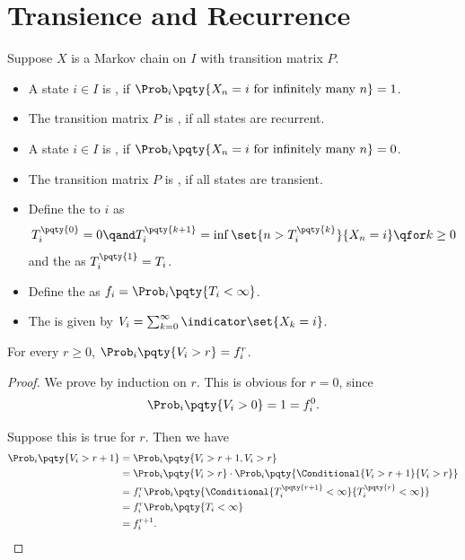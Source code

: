 \section{Transience and Recurrence}

\begin{definition}
    Suppose \(X\) is a Markov chain on \(I\) with transition matrix \(P\).
    \begin{itemize}
        \item A state \(i \in I\) is , if \(\Prob_i \pqty{X_n = i \text{ for infinitely many } n} = 1\).
        \item The transition matrix \(P\) is , if all states are recurrent.
        \item A state \(i \in I\) is , if \(\Prob_i \pqty{X_n = i \text{ for infinitely many } n} = 0\).
        \item The transition matrix \(P\) is , if all states are transient.
        \item Define the  to \(i\) as
        \[
            T_i^{\pqty{0}} = 0 \qand T_{i}^{\pqty{k + 1}} = \inf \set{n > T_i^{\pqty{k}}}{X_n = i} \qfor k \geq 0
        \]
        and the  as \(T_i^{\pqty{1}} = T_i\).
        \item Define the  as \(f_i = \Prob_i \pqty{T_i < \infty}\).
        \item The  is given by \(V_i = \sum_{k = 0}^{\infty} \indicator \set{X_k = i}\).
    \end{itemize}
\end{definition}

\begin{lemma}
    \label{lem:return-probabilities-and-total-number-of-visits}%
    For every \(r \geq 0\), \(\Prob_{i} \pqty{V_i > r} = f_i^r\).
\end{lemma}

\begin{proof}
    We prove by induction on \(r\). This is obvious for \(r = 0\), since
    \[
        \Prob_i \pqty{V_i > 0} = 1 = f_i^0.
    \]

    Suppose this is true for \(r\). Then we have
    \begin{align*}
        \Prob_i \pqty{V_i > r + 1} &= \Prob_i \pqty{V_i > r + 1, V_i > r} \\
        &= \Prob_i \pqty{V_i > r} \cdot \Prob_i \pqty{\Conditional{V_i > r + 1}{V_i > r}} \\
        &= f_i^r \Prob_i \pqty{\Conditional{T_i^{\pqty{r + 1}} < \infty}{T_i^{\pqty{r}} < \infty}} \\
        &= f_i^r \Prob_i \pqty{T_i < \infty} \\
        &= f_i^{r + 1}.
    \end{align*}
\end{proof}

